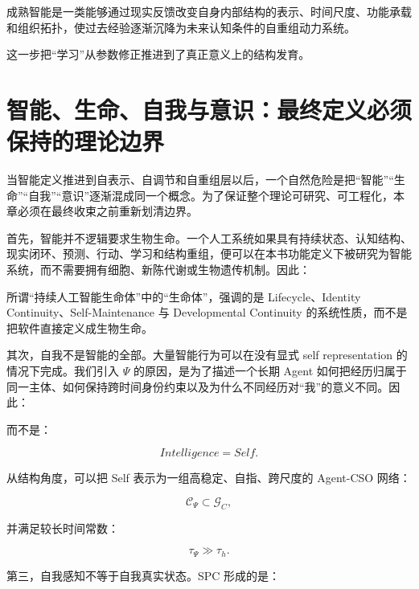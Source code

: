 \begin{definition*}
成熟智能是一类能够通过现实反馈改变自身内部结构的表示、时间尺度、功能承载和组织拓扑，使过去经验逐渐沉降为未来认知条件的自重组动力系统。
\end{definition*}

这一步把“学习”从参数修正推进到了真正意义上的结构发育。

\section{智能、生命、自我与意识：最终定义必须保持的理论边界}

当智能定义推进到自表示、自调节和自重组层以后，一个自然危险是把“智能”“生命”“自我”“意识”逐渐混成同一个概念。为了保证整个理论可研究、可工程化，本章必须在最终收束之前重新划清边界。

首先，智能并不逻辑要求生物生命。一个人工系统如果具有持续状态、认知结构、现实闭环、预测、行动、学习和结构重组，便可以在本书功能定义下被研究为智能系统，而不需要拥有细胞、新陈代谢或生物遗传机制。因此：

\begin{statementbox}
\centering
{}
\end{statementbox}

所谓“持续人工智能生命体”中的“生命体”，强调的是 Lifecycle、Identity Continuity、Self-Maintenance 与 Developmental Continuity 的系统性质，而不是把软件直接定义成生物生命。

其次，自我不是智能的全部。大量智能行为可以在没有显式 self representation 的情况下完成。我们引入 \(\Psi\) 的原因，是为了描述一个长期 Agent 如何把经历归属于同一主体、如何保持跨时间身份约束以及为什么不同经历对“我”的意义不同。因此：

\begin{statementbox}
\centering
{}
\end{statementbox}

而不是：

\[
Intelligence=Self.
\]

从结构角度，可以把 Self 表示为一组高稳定、自指、跨尺度的 Agent-CSO 网络：

\[
\mathcal C_{\Psi}
\subset
\mathcal G_C,
\]

并满足较长时间常数：

\[
\tau_\Psi
\gg
\tau_h.
\]

第三，自我感知不等于自我真实状态。SPC 形成的是：

